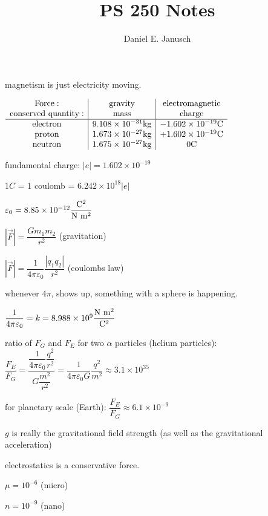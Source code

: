 \documentclass[12pt]{article}
\newcommand \kvalue {\dfrac 1{4 \pi \varepsilon_0}}
\begin{document}

\title{PS 250 Notes}
\author{Daniel E. Janusch}
\maketitle

magnetism is just electricity moving.

$\begin{array}{c|c|c}
{\rm Force:} & {\rm gravity} & {\rm electromagnetic}\\
{\rm conserved~quantity:} & {\rm mass} & {\rm charge}\\
\hline
{\rm electron} & 9.108 \times 10^{-31} {\rm kg} & -1.602 \times 10^{-19} {\rm C}\\
{\rm proton} & 1.673 \times 10^{-27} {\rm kg} & +1.602 \times 10^{-19} {\rm C}\\
{\rm neutron} & 1.675 \times 10^{-27} {\rm kg} & 0 {\rm C}\\
\end{array}$

fundamental charge: $|e| = 1.602 \times 10^{-19}$

$1 C$ = 1 coulomb = $6.242 \times 10^{18} |e|$

$\varepsilon_0 = 8.85 \times 10^{-12}\dfrac{{\rm C}^2}{{\rm N}~{\rm m}^2}$

$|\vec F| = \dfrac{G m_1 m_2}{r^2}$ (gravitation)

$|\vec F| = \kvalue \dfrac{|q_1 q_2|}{r^2}$ (coulombs law)

whenever $4\pi$, shows up, something with a sphere is happening.

$\kvalue = k = 8.988\times 10^9 \dfrac{{\rm N}~{\rm m}^2}{{\rm C}^2}$

ratio of $F_G$ and $F_E$ for two $\alpha$ particles (helium particles): $\dfrac{F_E}{F_G} = \dfrac{\dfrac 1{4\pi\varepsilon_0}\dfrac{q^2}{r^2}}{G\dfrac{m^2}{r^2}} = \dfrac 1 {4\pi\varepsilon_0 G} \dfrac{q^2}{m^2} \approx 3.1 \times 10^{35}$

for planetary scale (Earth): $\dfrac{F_E}{F_G} \approx 6.1 \times 10^{-9}$

$g$ is really the gravitational field strength (as well as the gravitational acceleration)

electrostatics is a conservative force.

$\mu = 10^{-6}$ (micro)

$n = 10^{-9}$ (nano)
\end{document}
